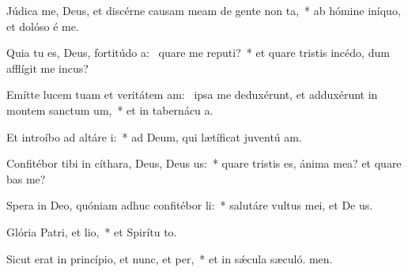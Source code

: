 \item Júdica me, Deus, et discérne causam meam de gente non ta,~* ab hómine iníquo, et dolóso é me.
\item Quia tu es, Deus, fortitúdo a:~\pscross{} quare me reputi?~* et quare tristis incédo, dum afflígit me incus?
\item Emítte lucem tuam et veritátem am:~\pscross{} ipsa me deduxérunt, et adduxérunt in montem sanctum um,~* et in tabernácu a.
\item Et introíbo ad altáre i:~* ad Deum, qui lætíficat juventú am.
\item Confitébor tibi in cíthara, Deus, Deus us:~* quare tristis es, ánima mea? et quare bas me?
\item Spera in Deo, quóniam adhuc confitébor li:~* salutáre vultus mei, et De us.
\item Glória Patri, et lio,~* et Spirítu to.
\item Sicut erat in princípio, et nunc, et per,~* et in sǽcula sæculó. men.
